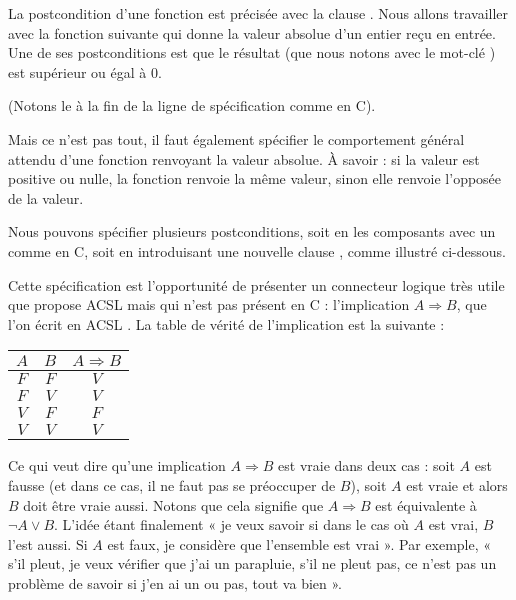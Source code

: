 

La postcondition d'une fonction est précisée avec la clause . 
Nous allons travailler avec la fonction suivante qui donne la valeur absolue
d'un entier reçu en entrée. 
Une de ses postconditions est que le résultat (que nous notons avec le 
mot-clé ) est supérieur ou égal à 0.






(Notons le \CodeInline{;} à la fin de la ligne de spécification comme en C).



Mais ce n'est pas tout, il faut également spécifier le comportement général 
attendu d'une fonction renvoyant la valeur absolue. À savoir : si la valeur
est positive ou nulle, la fonction renvoie la même valeur, sinon elle renvoie 
l'opposée de la valeur.



Nous pouvons spécifier plusieurs postconditions, soit en les composants avec 
un \CodeInline{\&\&} comme en C, soit en introduisant une nouvelle clause , 
comme illustré ci-dessous.






Cette spécification est l'opportunité de présenter un connecteur logique 
très utile que propose ACSL mais qui n'est pas présent en C : 
l'implication $A \Rightarrow B$, que l'on écrit en ACSL .
La table de vérité de l'implication est la suivante :



\begin{longtabu}{|c|c|c|} \hline
$A$ & $B$ & $A \Rightarrow B$ \\ \hline
$F$ & $F$ & $V$ \\ \hline
$F$ & $V$ & $V$ \\ \hline
$V$ & $F$ & $F$ \\ \hline
$V$ & $V$ & $V$ \\ \hline
\end{longtabu}



Ce qui veut dire qu'une implication $A \Rightarrow B$ est vraie dans deux cas : 
soit $A$ est fausse (et dans ce cas, il ne faut pas se préoccuper de $B$), soit 
$A$ est vraie et alors $B$ doit être vraie aussi. Notons que cela signifie que
$A \Rightarrow B$ est équivalente à $\neg A \vee B$. L'idée étant finalement
« je veux savoir si dans le cas où $A$ est vrai, $B$ l'est aussi. Si $A$ est
faux, je considère que l'ensemble est vrai ». Par exemple, « s'il pleut, je veux
vérifier que j'ai un parapluie, s'il ne pleut pas, ce n'est pas un problème
de savoir si j'en ai un ou pas, tout va bien ».



